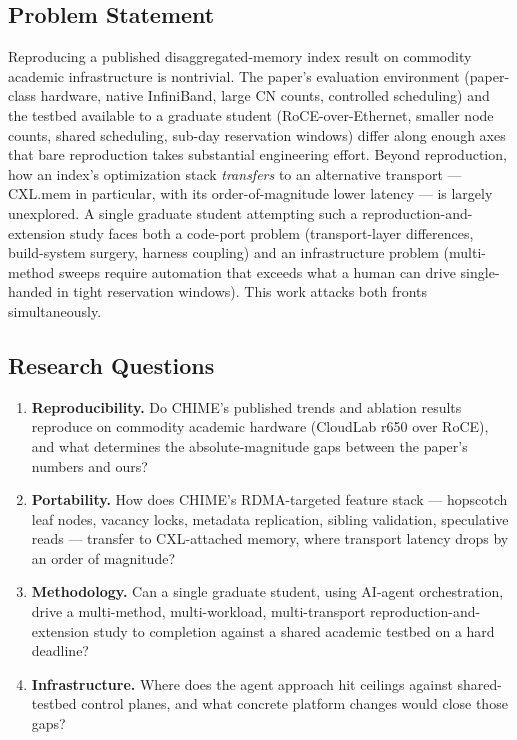 \documentclass[11pt,a4paper]{article}
\begin{document}
\subsection{Problem Statement}
\label{sec:problem}

Reproducing a published disaggregated-memory index result on commodity academic infrastructure is nontrivial. The paper's evaluation environment (paper-class hardware, native InfiniBand, large CN counts, controlled scheduling) and the testbed available to a graduate student (RoCE-over-Ethernet, smaller node counts, shared scheduling, sub-day reservation windows) differ along enough axes that bare reproduction takes substantial engineering effort. Beyond reproduction, how an index's optimization stack \emph{transfers} to an alternative transport --- CXL.mem in particular, with its order-of-magnitude lower latency --- is largely unexplored. A single graduate student attempting such a reproduction-and-extension study faces both a code-port problem (transport-layer differences, build-system surgery, harness coupling) and an infrastructure problem (multi-method sweeps require automation that exceeds what a human can drive single-handed in tight reservation windows). This work attacks both fronts simultaneously.

\subsection{Research Questions}
\label{sec:rq}

\begin{enumerate}[label=\textbf{RQ\arabic*.},nosep,leftmargin=*]
    \item \textbf{Reproducibility.} Do CHIME's published trends and ablation results reproduce on commodity academic hardware (CloudLab r650 over RoCE), and what determines the absolute-magnitude gaps between the paper's numbers and ours?
    \item \textbf{Portability.} How does CHIME's RDMA-targeted feature stack --- hopscotch leaf nodes, vacancy locks, metadata replication, sibling validation, speculative reads --- transfer to CXL-attached memory, where transport latency drops by an order of magnitude?
    \item \textbf{Methodology.} Can a single graduate student, using AI-agent orchestration, drive a multi-method, multi-workload, multi-transport reproduction-and-extension study to completion against a shared academic testbed on a hard deadline?
    \item \textbf{Infrastructure.} Where does the agent approach hit ceilings against shared-testbed control planes, and what concrete platform changes would close those gaps?
\end{enumerate}
\end{document}
